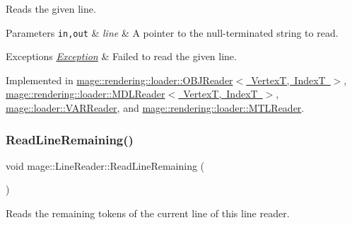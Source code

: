 Reads the given line.


\begin{DoxyParams}[1]{Parameters}
\mbox{\tt in,out}  & {\em line} & A pointer to the null-\/terminated string to read. \\
\hline
\end{DoxyParams}

\begin{DoxyExceptions}{Exceptions}
{\em \mbox{\hyperlink{classmage_1_1_exception}{Exception}}} & Failed to read the given line. \\
\hline
\end{DoxyExceptions}


Implemented in \mbox{\hyperlink{classmage_1_1rendering_1_1loader_1_1_o_b_j_reader_a6552753d2295585283df035732f38dbd}{mage\+::rendering\+::loader\+::\+O\+B\+J\+Reader$<$ Vertex\+T, Index\+T $>$}}, \mbox{\hyperlink{classmage_1_1rendering_1_1loader_1_1_m_d_l_reader_a121bfa0a48d01bdc37cf09b7f3a25a27}{mage\+::rendering\+::loader\+::\+M\+D\+L\+Reader$<$ Vertex\+T, Index\+T $>$}}, \mbox{\hyperlink{classmage_1_1loader_1_1_v_a_r_reader_a511a0778cc515aece781bfdb76024cea}{mage\+::loader\+::\+V\+A\+R\+Reader}}, and \mbox{\hyperlink{classmage_1_1rendering_1_1loader_1_1_m_t_l_reader_a54eb83757c915ebca73175e83737cf73}{mage\+::rendering\+::loader\+::\+M\+T\+L\+Reader}}.

\mbox{\label{classmage_1_1_line_reader_a3a4b99bfef1e8a826d74a01bcc663fcb}} 
\subsubsection{\texorpdfstring{Read\+Line\+Remaining()}{ReadLineRemaining()}}
{\footnotesize\ttfamily void mage\+::\+Line\+Reader\+::\+Read\+Line\+Remaining (\begin{DoxyParamCaption}{ }\end{DoxyParamCaption})\hspace{0.3cm}{\ttfamily [protected]}}

Reads the remaining tokens of the current line of this line reader. \mbox{\label{classmage_1_1_line_reader_ae9a7547d01b29c3237b198444d4f3aef}} 
